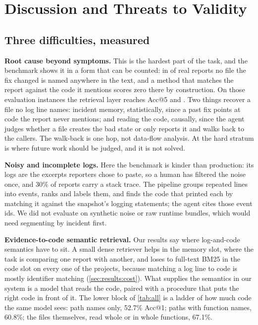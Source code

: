 \section{Discussion and Threats to Validity}
\label{sec:discussion}

\subsection{Three difficulties, measured}
\label{sec:discussion:difficulties}

\textbf{Root cause beyond symptoms.} This is the hardest part of the
task, and the benchmark shows it in a form that can be counted:
in \nHardPct{} of real reports no file the fix changed is named
anywhere in the text, and a method that matches the report against the
code it mentions scores zero there by construction. On those
\nEvalHard{} evaluation instances the retrieval layer reaches
\retrHardFive{} Acc@5 and \sys{} \hardFive{}. Two things recover a file
no log line names: incident memory, statistically, since a past fix
points at code the report never mentions; and reading the code,
causally, since the agent judges whether a file creates the bad state
or only reports it and walks back to the callers. The walk-back is one hop, not data-flow analysis. At \hardFive{}
the hard stratum is where future work should be judged, and it is not
solved.

\textbf{Noisy and incomplete logs.} Here the benchmark is kinder than
production: its logs are the excerpts reporters chose to paste, so a
human has filtered the noise once, and 30\% of reports carry a stack
trace. The pipeline groups repeated lines into events, ranks and labels
them, and finds the code that printed each by matching it against the
snapshot's logging statements; the agent cites those event ids. We did
not evaluate on synthetic noise or raw runtime bundles, which would
need segmenting by incident first.

\textbf{Evidence-to-code semantic retrieval.} Our results say where
log-and-code semantics have to sit. A small dense
retriever helps in the memory slot, where the task is comparing one
report with another, and loses to full-text BM25 in the code slot on
every one of the \nProjects{} projects, because matching a log line to
code is mostly identifier matching (\cref{sec:results:cost}). What
supplies the semantics in our system is a model that reads the code,
paired with a procedure that puts the right code in front of it.
The lower block of \cref{tab:all} is a ladder of how much code the same
model sees: path names only, 52.7\% Acc@1; paths with function names,
60.8\%; the files themselves, read whole or in whole functions, 67.1\%.

